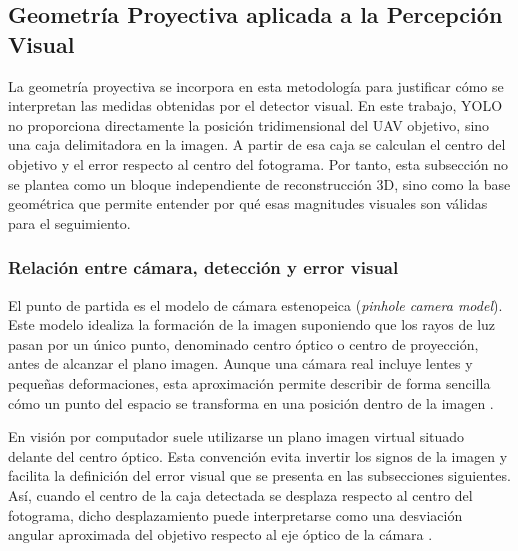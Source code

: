 \subsection{Geometría Proyectiva aplicada a la Percepción Visual}

\vspace{0.3cm}

La geometría proyectiva se incorpora en esta metodología para justificar cómo se interpretan las medidas obtenidas por el detector visual. En este trabajo, YOLO no proporciona directamente la posición tridimensional del UAV objetivo, sino una caja delimitadora en la imagen. A partir de esa caja se calculan el centro del objetivo y el error respecto al centro del fotograma. Por tanto, esta subsección no se plantea como un bloque independiente de reconstrucción 3D, sino como la base geométrica que permite entender por qué esas magnitudes visuales son válidas para el seguimiento.

\vspace{0.3cm}

\subsubsection{Relación entre cámara, detección y error visual}

\vspace{0.3cm}

El punto de partida es el modelo de cámara estenopeica (\textit{pinhole camera model}). Este modelo idealiza la formación de la imagen suponiendo que los rayos de luz pasan por un único punto, denominado centro óptico o centro de proyección, antes de alcanzar el plano imagen. Aunque una cámara real incluye lentes y pequeñas deformaciones, esta aproximación permite describir de forma sencilla cómo un punto del espacio se transforma en una posición dentro de la imagen \cite{uvaPinholeCamera, bergamasco2019pinhole}.

\vspace{0.3cm}

En visión por computador suele utilizarse un plano imagen virtual situado delante del centro óptico. Esta convención evita invertir los signos de la imagen y facilita la definición del error visual que se presenta en las subsecciones siguientes. Así, cuando el centro de la caja detectada se desplaza respecto al centro del fotograma, dicho desplazamiento puede interpretarse como una desviación angular aproximada del objetivo respecto al eje óptico de la cámara \cite{uvaPinholeCamera, CameraModels}.

